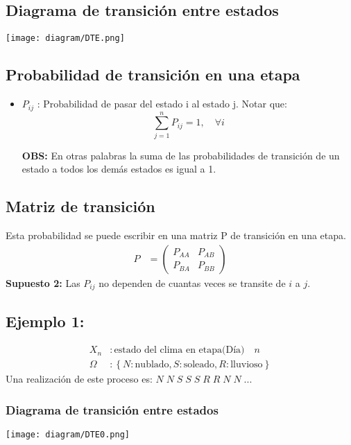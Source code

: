 \documentclass{templateNote}
\begin{document}
\subsection{Diagrama de transici\'on entre estados}
\begin{center}
    \texttt{[image: diagram/DTE.png]}
\end{center}
\subsection{Probabilidad de transici\'on en una etapa}
\begin{itemize}
    \item $P_{ij}$ : Probabilidad de pasar del estado i al estado j.
    Notar que:
    \begin{equation*}
        \sum_{j=1}^{n}{P_{ij}} = 1, \quad \forall i
    \end{equation*}

    \textbf{OBS:} En otras palabras la suma de las probabilidades de transici\'on de un estado a todos los dem\'as estados es igual a 1.
\end{itemize}
\subsection{Matriz de transici\'on}
Esta probabilidad se puede escribir en una matriz P de transici\'on en una etapa.
\begin{align*}
    P &= \left(\begin{matrix}
        P_{AA} & P_{AB} \\
        P_{BA} & P_{BB}
    \end{matrix} \right)
\end{align*}
\textbf{Supuesto 2:}
Las $P_{ij}$ no dependen de cuantas veces se transite de $i$ a $j$.

\newpage
\subsection{Ejemplo 1:}
\begin{align*}
    X_n &: \text{estado del clima en etapa(D\'ia)} \quad n \\
    \Omega &: \left\{N:\text{nublado}, S:\text{soleado}, R:\text{lluvioso}\right\}    
\end{align*}
Una realizaci\'on de este proceso es: $N\; N\; S\; S\; S\; R\; R\; N\; N\; ...$
\subsubsection*{Diagrama de transici\'on entre estados}
\begin{center}
    \texttt{[image: diagram/DTE0.png]}
\end{center}
\end{document}
